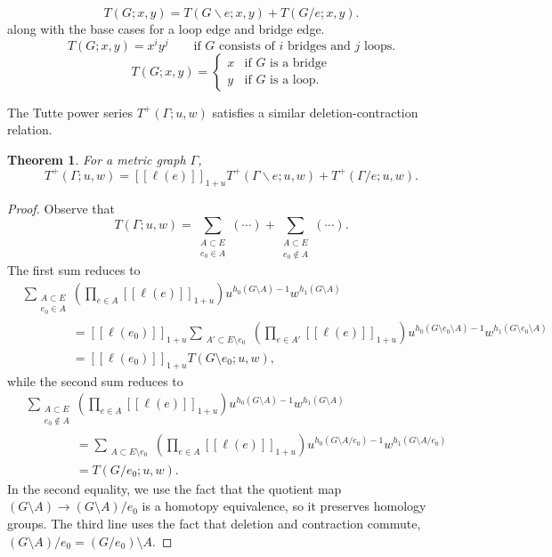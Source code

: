 \documentclass{amsart}
\newtheorem{thm}{Theorem}
\theoremstyle{definition}
\newcommand{\fanalog}[2]{[\![#2]\!]_{#1}}
\begin{document}
\begin{equation*}
T(G;x,y) = T(G \backslash e; x,y) + T(G / e; x,y).
\end{equation*}
along with the base cases for a loop edge and bridge edge.
\begin{equation*}
T(G; x,y) = x^i y^j \qquad\text{if $G$ consists of $i$ bridges and $j$ loops.}
\end{equation*}
\begin{equation*}
T(G;x,y) = \begin{cases}
x & \text{if $G$ is a bridge} \\
y & \text{if $G$ is a loop}.
\end{cases}
\end{equation*}

The Tutte power series $T^+(\Gamma; u,w)$ satisfies a similar deletion-contraction relation.

\begin{thm}
For a metric graph $\Gamma$,
\begin{equation}
T^+(\Gamma; u,w) = \fanalog{1 + u}{\ell(e)} T^+(\Gamma \backslash e; u,w) + T^+(\Gamma / e; u,w) .
\end{equation}
\end{thm}

\begin{proof}
Observe that
\[
	T(\Gamma; u,w) = \sum_{\substack{A \subset E \\ e_0 \in A}} (\cdots) + \sum_{\substack{A \subset E \\ e_0 \not \in A}} (\cdots).
\]
The first sum reduces to
\begin{align*}
	&\sum_{\substack{A \subset E \\ e_0 \in A}} \left( \prod_{e \in A} \fanalog{1+u}{\ell(e)} \right) u^{h_0(G\setminus A)-1}w^{h_1(G\setminus A)}\\
	&\qquad\qquad = \fanalog{1+u}{\ell(e_0)} \sum_{\substack{A' \subset E \setminus e_0}} \left( \prod_{e \in A'}\fanalog{1+u}{\ell(e)} \right) u^{h_0(G\setminus e_0\setminus A)-1}w^{h_1(G\setminus e_0\setminus A)} \\[1.5em]
	&\qquad\qquad = \fanalog{1+u}{\ell(e_0)} T(G\setminus e_0;u,w),
\end{align*}
while the second sum reduces to
\begin{align*}
	&\sum_{\substack{A \subset E \\ e_0 \not\in A}} \left( \prod_{e \in A} \fanalog{1+u}{\ell(e)} \right) u^{h_0(G\setminus A)-1}w^{h_1(G\setminus A)}\\
	&\qquad\qquad = \sum_{\substack{A \subset E \setminus e_0}} \left( \prod_{e \in A} \fanalog{1+u}{\ell(e)} \right) u^{h_0(G \setminus A / e_0)-1}w^{h_1(G\setminus A / e_0)} \\[1.5em]
	&\qquad\qquad = T(G/ e_0;u,w).
\end{align*}
In the second equality, we use the fact that the quotient map $(G\setminus A) \to (G\setminus A)/e_0$ is a homotopy equivalence, so it preserves homology groups. The third line uses the fact that deletion and contraction commute, $(G \setminus A) / e_0 = (G / e_0) \setminus A$.
\end{proof}
\end{document}
